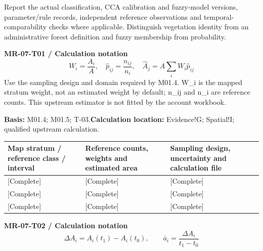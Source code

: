 Report the actual classification, CCA calibration and fuzzy-model versions, parameter/rule records, independent reference observations and temporal-comparability checks where applicable. Distinguish vegetation identity from an administrative forest definition and fuzzy membership from probability.\par
{}
\par\begingroup\sffamily\fontsize{8.4}{10.5}\selectfont\color{NEBGreen}
\textbf{MR-07-T01 / Calculation notation}\
{\fontsize{10}{12}\selectfont\[W_i=\frac{A_i}{A},\quad \widehat p_{ij}=\frac{n_{ij}}{n_i},\quad \widehat A_j=A\sum_i W_i\widehat p_{ij}\]}
Use the sampling design and domain required by M01.4. W\_i is the mapped stratum weight, not an estimated weight by default; n\_ij and n\_i are reference counts. This upstream estimator is not fitted by the account workbook.\par
\textbf{Basis:} M01.4; M01.5; T-03.\quad\textbf{Calculation location:} Evidence!G; Spatial!I; qualified upstream calculation.\par\endgroup
{\sffamily\fontsize{8.6}{10.7}\selectfont\begin{longtable}{@{}P{48mm}P{61mm}P{53mm}@{}}
\toprule
\textbf{Map stratum / reference class / interval} & \textbf{Reference counts, weights and estimated area} & \textbf{Sampling design, uncertainty and calculation file}\\\midrule\endhead
\rule{0pt}{8mm}[Complete] & [Complete] & [Complete]\\\hline
\rule{0pt}{8mm}[Complete] & [Complete] & [Complete]\\\hline
\rule{0pt}{8mm}[Complete] & [Complete] & [Complete]\\\hline
\end{longtable}}
\par\begingroup\sffamily\fontsize{8.4}{10.5}\selectfont\color{NEBGreen}
\textbf{MR-07-T02 / Calculation notation}\
{\fontsize{10}{12}\selectfont\[\Delta A_i=A_i(t_1)-A_i(t_0),\qquad \bar a_i=\frac{\Delta A_i}{t_1-t_0}\]}
